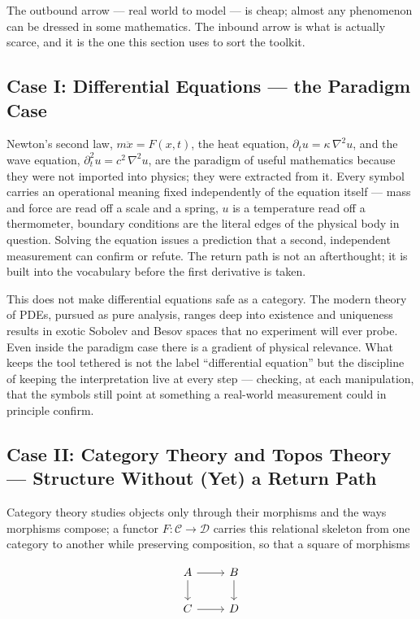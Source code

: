 The outbound arrow --- real world to model --- is cheap; almost any phenomenon
can be dressed in some mathematics. The inbound arrow is what is actually
scarce, and it is the one this section uses to sort the toolkit.

\subsection{Case I: Differential Equations --- the Paradigm Case}

Newton's second law, $m\ddot{x} = F(x,t)$, the heat equation, $\partial_t u =
\kappa\,\nabla^2 u$, and the wave equation, $\partial_t^2 u = c^2\,\nabla^2 u$,
are the paradigm of useful mathematics because they were not imported into
physics; they were extracted from it. Every symbol carries an operational
meaning fixed independently of the equation itself --- mass and force are read
off a scale and a spring, $u$ is a temperature read off a thermometer, boundary
conditions are the literal edges of the physical body in question. Solving the
equation issues a prediction that a second, independent measurement can confirm
or refute. The return path is not an afterthought; it is built into the
vocabulary before the first derivative is taken.

This does not make differential equations safe as a category. The modern theory
of PDEs, pursued as pure analysis, ranges deep into existence and uniqueness
results in exotic Sobolev and Besov spaces that no experiment will ever probe.
Even inside the paradigm case there is a gradient of physical relevance. What
keeps the tool tethered is not the label ``differential equation'' but the
discipline of keeping the interpretation live at every step --- checking, at
each manipulation, that the symbols still point at something a real-world
measurement could in principle confirm.

\subsection{Case II: Category Theory and Topos Theory --- Structure Without (Yet) a Return Path}

Category theory studies objects only through their morphisms and the ways
morphisms compose; a functor $F: \mathcal{C} \to \mathcal{D}$ carries this
relational skeleton from one category to another while preserving composition,
so that a square of morphisms

\[
\begin{tikzcd}
A \arrow[r, ] \arrow[d, '] & B \arrow[d, ] \\
C \arrow[r, '] & D
\end{tikzcd}
\]

